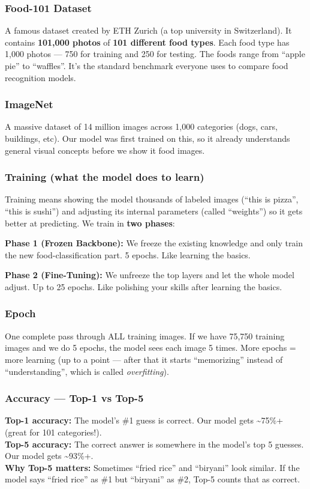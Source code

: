 \documentclass[11pt,a4paper]{article}
\begin{document}
\subsubsection{Food-101 Dataset}
A famous dataset created by ETH Zurich (a top university in Switzerland). It contains \textbf{101,000 photos} of \textbf{101 different food types}. Each food type has 1,000 photos --- 750 for training and 250 for testing. The foods range from ``apple pie'' to ``waffles''. It's the standard benchmark everyone uses to compare food recognition models.

\subsubsection{ImageNet}
A massive dataset of 14 million images across 1,000 categories (dogs, cars, buildings, etc). Our model was first trained on this, so it already understands general visual concepts before we show it food images.

\subsubsection{Training (what the model does to learn)}
Training means showing the model thousands of labeled images (``this is pizza'', ``this is sushi'') and adjusting its internal parameters (called ``weights'') so it gets better at predicting. We train in \textbf{two phases}:

\textbf{Phase 1 (Frozen Backbone):} We freeze the existing knowledge and only train the new food-classification part. 5 epochs. Like learning the basics.

\textbf{Phase 2 (Fine-Tuning):} We unfreeze the top layers and let the whole model adjust. Up to 25 epochs. Like polishing your skills after learning the basics.

\subsubsection{Epoch}
One complete pass through ALL training images. If we have 75,750 training images and we do 5 epochs, the model sees each image 5 times. More epochs = more learning (up to a point --- after that it starts ``memorizing'' instead of ``understanding'', which is called \textit{overfitting}).

\subsubsection{Accuracy --- Top-1 vs Top-5}
\textbf{Top-1 accuracy:} The model's \#1 guess is correct. Our model gets \textasciitilde75\%+ (great for 101 categories!).\\
\textbf{Top-5 accuracy:} The correct answer is somewhere in the model's top 5 guesses. Our model gets \textasciitilde93\%+.\\
\textbf{Why Top-5 matters:} Sometimes ``fried rice'' and ``biryani'' look similar. If the model says ``fried rice'' as \#1 but ``biryani'' as \#2, Top-5 counts that as correct.
\end{document}
